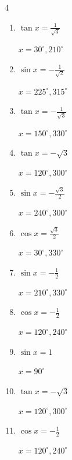 \begin{multicols}{4}
\begin{enumerate}
        $\displaystyle x = 30^{\circ} , 210^{\circ}$

  \item $\displaystyle \tan{x}  = \frac{1}{\sqrt{3}}$

        $\displaystyle x = 30^{\circ} , 210^{\circ}$

  \item $\displaystyle \sin{x}  = -\frac{1}{\sqrt{2}}$

        $\displaystyle x = 225^{\circ} , 315^{\circ}$

  \item $\displaystyle \tan{x}  = -\frac{1}{\sqrt{3}}$

        $\displaystyle x = 150^{\circ} , 330^{\circ}$

  \item $\displaystyle \tan{x}  = -\sqrt{3}$

        $\displaystyle x = 120^{\circ} , 300^{\circ}$

  \item $\displaystyle \sin{x}  = -\frac{\sqrt{3}}{2}$

        $\displaystyle x = 240^{\circ} , 300^{\circ}$

  \item $\displaystyle \cos{x}  = \frac{\sqrt{3}}{2}$

        $\displaystyle x = 30^{\circ} , 330^{\circ}$

  \item $\displaystyle \sin{x}  = -\frac{1}{2}$

        $\displaystyle x = 210^{\circ} , 330^{\circ}$

  \item $\displaystyle \cos{x}  = -\frac{1}{2}$

        $\displaystyle x = 120^{\circ} , 240^{\circ}$

\columnbreak %

  \item $\displaystyle \sin{x}  = 1$

        $\displaystyle x = 90^{\circ}$

  \item $\displaystyle \tan{x}  = -\sqrt{3}$

        $\displaystyle x = 120^{\circ} , 300^{\circ}$

  \item $\displaystyle \cos{x}  = -\frac{1}{2}$

        $\displaystyle x = 120^{\circ} , 240^{\circ}$


\end{enumerate}
\end{multicols}
